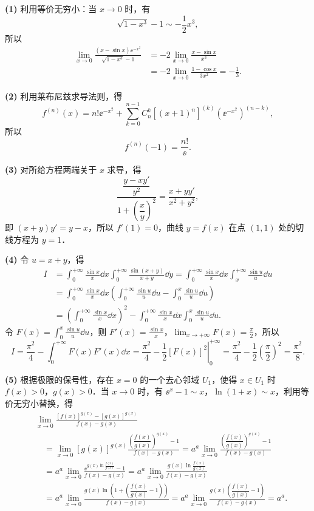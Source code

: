 \begin{solution}
\textbf{(1)} 利用等价无穷小：当 $x\to 0$ 时，有
\[
  \sqrt{1-x^3}-1\sim-\frac{1}{2}x^3,
\]
所以
\begin{align*}
\lim_{x\to0}\frac{(x-\sin x)\ee^{-x^2}}{\sqrt{1-x^3}-1}
&=-2\lim_{x\to0}\frac{x-\sin x}{x^3}\\
&=-2\lim_{x\to0}\frac{1-\cos x}{3x^2}
=-\frac{1}{3}.
\end{align*}

\textbf{(2)} 利用莱布尼兹求导法则，得
\[
  f^{(n)}(x)=n!\ee^{-x^2}+\sum_{k=0}^{n-1}C_n^k[(x+1)^n]^{(k)}(\ee^{-x^2})^{(n-k)},
\]
所以
\[
  f^{(n)}(-1)=\frac{n!}{\ee}.
\]

\textbf{(3)} 对所给方程两端关于 $x$ 求导，得
\[
  \frac{\dfrac{y-xy'}{y^2}}{1+\left(\dfrac{x}{y}\right)^2}
  =\frac{x+yy'}{x^2+y^2},
\]
即 $(x+y)y'=y-x$，所以 $f'(1)=0$，曲线 $y=f(x)$ 在点 $(1,1)$ 处的切线方程为 $y=1$．

\textbf{(4)} 令 $u=x+y$，得
\begin{align*}
I&=\int_0^{+\infty}\frac{\sin x}{x}\dd x\int_0^{+\infty}\frac{\sin(x+y)}{x+y}\dd y
=\int_0^{+\infty}\frac{\sin x}{x}\dd x\int_x^{+\infty}\frac{\sin u}{u}\dd u\\
&=\int_0^{+\infty}\frac{\sin x}{x}\dd x\left(\int_0^{+\infty}\frac{\sin u}{u}\dd u-\int_0^x\frac{\sin u}{u}\dd u\right)\\
&=\left(\int_0^{+\infty}\frac{\sin x}{x}\dd x\right)^2
-\int_0^{+\infty}\frac{\sin x}{x}\dd x\int_0^x\frac{\sin u}{u}\dd u.
\end{align*}
令 $F(x)=\displaystyle\int_0^x\frac{\sin u}{u}\dd u$，则 $F'(x)=\frac{\sin x}{x}$，$\displaystyle\lim_{x\to+\infty}F(x)=\frac{\pi}{2}$，所以
\[
  I=\frac{\pi^2}{4}-\int_0^{+\infty}F(x)F'(x)\dd x
  =\frac{\pi^2}{4}-\left.\frac{1}{2}[F(x)]^2\right|_0^{+\infty}
  =\frac{\pi^2}{4}-\frac{1}{2}\left(\frac{\pi}{2}\right)^2
  =\frac{\pi^2}{8}.
\]

\textbf{(5)} 根据极限的保号性，存在 $x=0$ 的一个去心邻域 $U_1$，使得 $x\in U_1$ 时 $f(x)>0$，$g(x)>0$．当 $x\to 0$ 时，有 $\ee^x-1\sim x$，$\ln(1+x)\sim x$，利用等价无穷小替换，得
\begin{align*}
&\lim_{x\to0}\frac{[f(x)]^{g(x)}-[g(x)]^{g(x)}}{f(x)-g(x)}\\
&\quad=\lim_{x\to0}[g(x)]^{g(x)}
\frac{\left(\dfrac{f(x)}{g(x)}\right)^{g(x)}-1}{f(x)-g(x)}
=a^a\lim_{x\to0}\frac{\left(\dfrac{f(x)}{g(x)}\right)^{g(x)}-1}{f(x)-g(x)}\\
&\quad=a^a\lim_{x\to0}\frac{\ee^{g(x)\ln\frac{f(x)}{g(x)}}-1}{f(x)-g(x)}
=a^a\lim_{x\to0}\frac{g(x)\ln\frac{f(x)}{g(x)}}{f(x)-g(x)}\\
&\quad=a^a\lim_{x\to0}\frac{g(x)\ln\left(1+\left(\dfrac{f(x)}{g(x)}-1\right)\right)}{f(x)-g(x)}
=a^a\lim_{x\to0}\frac{g(x)\left(\dfrac{f(x)}{g(x)}-1\right)}{f(x)-g(x)}
=a^a.
\end{align*}
\end{solution}

